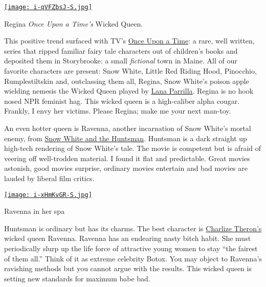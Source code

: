 \captionsetup[floatingfigure]{labelformat=empty}
\begin{floatingfigure}[r]{0.30\textwidth}
\centering
\href{http://beta.abc.go.com/shows/once-upon-a-time}{\texttt{[image: i-qVFZbsJ-S.jpg]}}
\caption{Regina \emph{Once Upon a Time's} Wicked Queen.}
\label{fig:2887X0}
\end{floatingfigure} This positive trend surfaced with TV's
\href{http://www.imdb.com/title/tt1843230/}{Once Upon a Time}: a rare,
well written, series that ripped familiar fairy tale characters out of
children's books and deposited them in Storybrooke: a small
\emph{fictional} town in Maine. All of our favorite characters are
present: Snow White, Little Red Riding Hood, Pinocchio, Rumplestiltskin
and, outclassing them all, Regina, Snow White's poison apple wielding
nemesis the Wicked Queen played by
\href{http://www.imdb.com/name/nm0663469/}{Lana Parrilla}. Regina is no
hook nosed NPR feminist hag. This wicked queen is a high-caliber alpha
cougar. Frankly, I envy her victims. Please Regina; make me your next
man-toy.

An even hotter queen is Ravenna, another incarnation of Snow White's
mortal enemy, from
\href{http://www.rottentomatoes.com/m/snow\_white\_and\_the\_huntsman/}{Snow
White and the Huntsman}. Huntsman is a dark straight up high-tech
rendering of Snow White's tale. The movie is competent but is afraid of
veering off well-trodden material. I found it flat and predictable.
Great movies astonish, good movies surprise, ordinary movies entertain
and bad movies are lauded by liberal film critics.




\begin{floatingfigure}[l]{0.28\textwidth}
\centering
\href{http://www.snowwhiteandthehuntsman.com/}{\texttt{[image: i-xHmKvGR-S.jpg]}}
\caption{Ravenna in her spa}
\label{fig:2887X1}
\end{floatingfigure} Huntsman is ordinary but has its charms. The best character is 
\href{http://en.wikipedia.org/wiki/Charlize_Theron}{Charlize Theron's} wicked queen Ravenna. 
Ravenna has an endearing nasty bitch
habit. She must periodically slurp up the life force of attractive young
women to stay ``the fairest of them all.'' Think of it as extreme
celebrity Botox. You may object to Ravenna's ravishing methods but you
cannot argue with the results. This wicked queen is setting new
standards for maximum babe bad.

